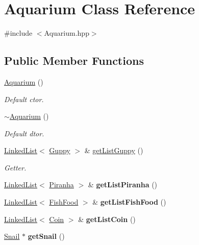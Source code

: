 \hypertarget{class_aquarium}{}\section{Aquarium Class Reference}
\label{class_aquarium}


{\ttfamily \#include $<$Aquarium.\+hpp$>$}

\subsection*{Public Member Functions}
\begin{DoxyCompactItemize}
\item 
\mbox{\hyperlink{class_aquarium_a0176cc59bd34e39fd3d79d56d4db4d08}{Aquarium}} ()
\begin{DoxyCompactList}\small\item\em Default ctor. \end{DoxyCompactList}\item 
\mbox{\label{class_aquarium_a40f31f27104d48e4f558d40059f4a590}} 
\mbox{\hyperlink{class_aquarium_a40f31f27104d48e4f558d40059f4a590}{$\sim$\+Aquarium}} ()
\begin{DoxyCompactList}\small\item\em Default dtor. \end{DoxyCompactList}\item 
\mbox{\label{class_aquarium_aa2a98b127996740aee0c4d2a7250dd1b}} 
\mbox{\hyperlink{class_linked_list}{Linked\+List}}$<$ \mbox{\hyperlink{class_guppy}{Guppy}} $>$ \& \mbox{\hyperlink{class_aquarium_aa2a98b127996740aee0c4d2a7250dd1b}{get\+List\+Guppy}} ()
\begin{DoxyCompactList}\small\item\em Getter. \end{DoxyCompactList}\item 
\mbox{\label{class_aquarium_adc35c3ac09b3b626a85d9abf715cea46}} 
\mbox{\hyperlink{class_linked_list}{Linked\+List}}$<$ \mbox{\hyperlink{class_piranha}{Piranha}} $>$ \& {\bfseries get\+List\+Piranha} ()
\item 
\mbox{\label{class_aquarium_af9f33c2682400c78270dbd13424b70ba}} 
\mbox{\hyperlink{class_linked_list}{Linked\+List}}$<$ \mbox{\hyperlink{class_fish_food}{Fish\+Food}} $>$ \& {\bfseries get\+List\+Fish\+Food} ()
\item 
\mbox{\label{class_aquarium_af59f95866b9466ddba258a81eb09026e}} 
\mbox{\hyperlink{class_linked_list}{Linked\+List}}$<$ \mbox{\hyperlink{class_coin}{Coin}} $>$ \& {\bfseries get\+List\+Coin} ()
\item 
\mbox{\label{class_aquarium_a3946ccff0980d547733dc49541a1b571}} 
\mbox{\hyperlink{class_snail}{Snail}} $\ast$ {\bfseries get\+Snail} ()
\end{DoxyCompactItemize}


